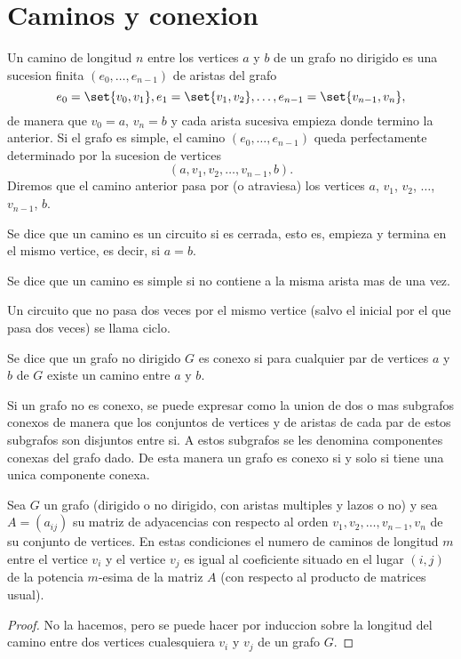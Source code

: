 \section{Caminos y conexion}
\begin{definition}[Camino]
	Un camino de longitud \(n \) entre los vertices \(a \) y \(b \) de un grafo no dirigido es una sucesion finita \((e_0, \ldots, e_{n-1})\) de aristas del grafo
	\[
		e_0 = \set{v_{0}, v_1}, e_1 = \set{v_1,v_2},\ldots,e_{n-1} = \set{v_{n-1}, v_n },
	\]
	de manera que \(v_0 = a \), \(v_n = b \) y cada arista sucesiva empieza donde termino la anterior. Si el grafo es simple, el camino \((e_0, \ldots, e_{n-1})\) queda perfectamente determinado por la sucesion de vertices
	\[
		(a,v_1,v_2,\ldots,v_{n-1}, b ).
	\]
	Diremos que el camino anterior pasa por (o atraviesa) los vertices  
	\(a\), \(v_1\), \(v_2\), \(\ldots\), \(v_{n-1}\), \(b \).
	
	Se dice que un camino es un circuito si es cerrada, esto es, empieza y termina en el mismo vertice, es decir, si \(a = b\).
	
	Se dice que un camino es simple si no contiene a la misma arista mas de una vez.
	
	Un circuito que no pasa dos veces por el mismo vertice (salvo el inicial por el que pasa dos veces) se llama ciclo.
\end{definition}

\begin{definition}[Conexo]
	Se dice que un grafo no dirigido \(G \) es conexo si para cualquier par de vertices \(a \) y \(b \) de \(G \) existe un camino entre \(a \) y \(b \).
\end{definition}

Si un grafo no es conexo, se puede expresar como la union de dos o mas subgrafos conexos de manera que los conjuntos de vertices y de aristas de cada par de estos subgrafos son disjuntos entre si. A estos subgrafos se les denomina componentes conexas del grafo dado. De esta manera un grafo es conexo si y solo si tiene una unica componente conexa.

\begin{theorem}
	Sea \(G \) un grafo (dirigido o no dirigido, con aristas multiples y lazos o no) y sea \(A = (a_{ij })\) su matriz de adyacencias con respecto al orden \(v_1,v_2,\ldots,v_{n-1},v_n \) de su conjunto de vertices. En estas condiciones el numero de caminos de longitud \(m \) entre el vertice \(v_i \) y el vertice \(v_j \) es igual al coeficiente situado en el lugar \((i,j )\) de la potencia \(m\)-esima de la matriz \(A \) (con respecto al producto de matrices usual).
\end{theorem}
\begin{proof}
	No la hacemos, pero se puede hacer por induccion sobre la longitud del camino entre dos vertices cualesquiera \(v_i \) y \(v_j \) de un grafo \(G \).
\end{proof}

